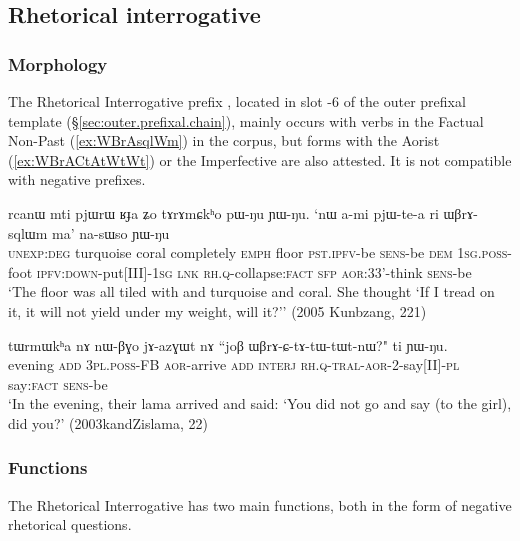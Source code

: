 
\subsection{Rhetorical interrogative} \label{sec:WBrA} 

\subsubsection{Morphology} \label{sec:WBrA.morphology} 
The Rhetorical Interrogative prefix , located in slot -6 of the outer prefixal template (§\ref{sec:outer.prefixal.chain}),  mainly occurs with verbs in the Factual Non-Past (\ref{ex:WBrAsqlWm}) in the corpus, but forms with the Aorist (\ref{ex:WBrACtAtWtWt}) or the Imperfective are also attested. It is not compatible with negative prefixes.

\begin{exe}
\ex \label{ex:WBrAsqlWm}
\gll rcanɯ mti pjɯrɯ ʁɟa ʑo tɤrɤmɕkʰo pɯ-ŋu ɲɯ-ŋu. `nɯ a-mi pjɯ-te-a ri ɯβrɤ-sqlɯm ma' na-sɯso ɲɯ-ŋu \\
\textsc{unexp}:\textsc{deg} turquoise  coral completely \textsc{emph} floor \textsc{pst}.\textsc{ipfv}-be \textsc{sens}-be \textsc{dem} \textsc{1sg}.\textsc{poss}-foot \textsc{ipfv}:\textsc{down}-put[III]-\textsc{1sg} \textsc{lnk} \textsc{rh}.\textsc{q}-collapse:\textsc{fact} \textsc{sfp} \textsc{aor}:3\fl{}3'-think \textsc{sens}-be \\
\glt `The floor was all tiled with and turquoise and coral. She thought `If I tread on it, it will not yield under my weight, will it?'' (2005 Kunbzang, 221)
\end{exe}

\begin{exe}
\ex \label{ex:WBrACtAtWtWt}
\gll tɯrmɯkʰa nɤ nɯ-βɣo jɤ-azɣɯt nɤ ``joβ ɯβrɤ-ɕ-tɤ-tɯ-tɯt-nɯ?" ti ɲɯ-ŋu. \\
evening \textsc{add} \textsc{3pl}.\textsc{poss}-FB \textsc{aor}-arrive \textsc{add} \textsc{interj} \textsc{rh}.\textsc{q}-\textsc{tral}-\textsc{aor}-2-say[II]-\textsc{pl} say:\textsc{fact} \textsc{sens}-be \\
\glt `In the evening, their lama arrived and said: `You did not go and say  (to the girl), did you?' (2003kandZislama, 22)
 \end{exe}
 
\subsubsection{Functions} \label{sec:WBrA.functions} 
The Rhetorical Interrogative has two main functions, both in the form of negative rhetorical questions. 

